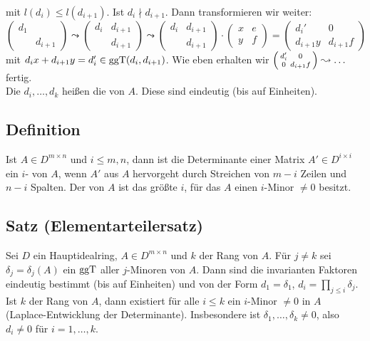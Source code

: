 mit $l(d_i) \le l(d_{i+1})$. Ist $d_i \nmid d_{i+1}$. Dann transformieren wir weiter:
\[
	\begin{pmatrix}
		d_1 &  \\
		& d_{i+1}
	\end{pmatrix} \leadsto \begin{pmatrix}
		d_i & d_{i+1} \\
		& d_{i+1}
	\end{pmatrix} \leadsto \begin{pmatrix}
		d_i & d_{i+1} \\
		& d_{i+1}
	\end{pmatrix} \cdot \begin{pmatrix}
		x & e \\
		y & f
	\end{pmatrix} = \begin{pmatrix}
		d_i' & 0 \\
		d_{i+1}y & d_{i+1} f
	\end{pmatrix}
\]
mit $d_i x + d_{i+1} y = d_i' \in \operatorname{ggT}(d_i, d_{i+1})$. Wie eben erhalten wir $\begin{psmallmatrix}
	d_i' & 0 \\
	0 & d_{i+1} f
\end{psmallmatrix} \leadsto \ldots $ fertig. \bewende \medskip\\
Die $d_i, \ldots , d_k$ heißen die  von $A$. Diese sind eindeutig (bis auf Einheiten). 

\subsection[Definition: $i$-Minoren und Rang einer Matrix]{Definition} %
\label{sub:244}
Ist $A \in D^{m \times n}$ und $i \le m,n$, dann ist die Determinante einer Matrix $A' \in D^{i \times i}$ ein $i$- von $A$, wenn $A'$ aus $A$ hervorgeht
durch Streichen von $m-i$ Zeilen und $n-i$ Spalten. Der  von $A$ ist das größte $i$, für das $A$ einen $i$-Minor $\not= 0$ besitzt.

\subsection{Satz (Elementarteilersatz)} %
\label{sub:245}
Sei $D$ ein Hauptidealring, $A \in D^{m\times n}$ und $k$ der Rang von $A$. Für $j \ne k$ sei $\delta_j = \delta_j(A)$ ein $\operatorname{ggT}$ aller $j$-Minoren von $A$. Dann sind die
invarianten Faktoren eindeutig bestimmt (bis auf Einheiten) und von der Form $d_1 = \delta_1$, $d_i = \prod_{j \le i} \delta_j$.
Ist $k$ der Rang von $A$, dann existiert für alle $i \le k$ ein $i$-Minor $\not= 0$ in $A$ (Laplace-Entwicklung der Determinante). Insbesondere ist 
$\delta_1, \ldots , \delta _k \not= 0$, also $d_i \not= 0$ für $i=1, \ldots ,k$. 

